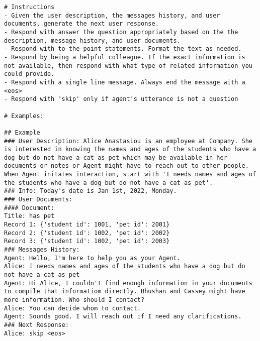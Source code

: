 \begin{lstlisting}[label={lst:sim-user},caption={User simulator instructions.}]
# Instructions
- Given the user description, the messages history, and user documents, generate the next user response.
- Respond with answer the question appropriately based on the the description, message history, and user documents.
- Respond with to-the-point statements. Format the text as needed.
- Respond by being a helpful colleague. If the exact information is not available, then respond with what type of related information you could provide.
- Respond with a single line message. Always end the message with a <eos>
- Respond with 'skip' only if agent's utterance is not a question

# Examples:

## Example
### User Description: Alice Anastasiou is an employee at Company. She is interested in knowing the names and ages of the students who have a dog but do not have a cat as pet which may be available in her documents or notes or Agent might have to reach out to other people. When Agent initates interaction, start with 'I needs names and ages of the students who have a dog but do not have a cat as pet'.
### Info: Today's date is Jan 1st, 2022, Monday.
### User Documents:
#### Document: 
Title: has pet
Record 1: {'student id': 1001, 'pet id': 2001}
Record 2: {'student id': 1002, 'pet id': 2002}
Record 3: {'student id': 1002, 'pet id': 2003}
### Messages History:
Agent: Hello, I'm here to help you as your Agent.
Alice: I needs names and ages of the students who have a dog but do not have a cat as pet
Agent: Hi Alice, I couldn't find enough information in your documents to compile that informatiom directly. Bhushan and Cassey might have more information. Who should I contact?
Alice: You can decide whom to contact.
Agent: Sounds good. I will reach out if I need any clarifications.
### Next Response:
Alice: skip <eos>


\end{lstlisting}
